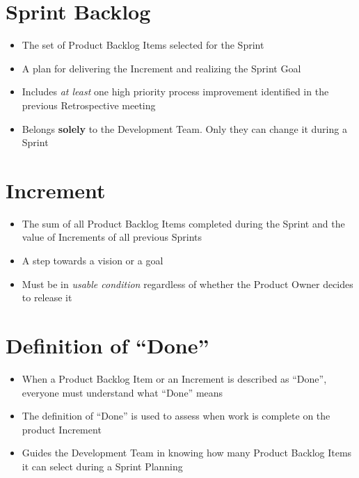 \documentclass[a4paper,11pt,twocolumn]{article}
\begin{document}
\section*{Sprint Backlog}
\begin{itemize}
	\item The set of Product Backlog Items selected for the Sprint
	\item A plan for delivering the Increment and realizing the Sprint Goal
	\item Includes \textit{at least} one high priority process improvement identified in the previous Retrospective meeting
	\item Belongs \textbf{solely} to the Development Team. Only they can change it during a Sprint
\end{itemize}

\section*{Increment}
\begin{itemize}
	\item The sum of all Product Backlog Items completed during the Sprint and the value of Increments of all previous Sprints
	\item A step towards a vision or a goal
	\item Must be in \textit{usable condition} regardless of whether the Product Owner decides to release it
\end{itemize}

\section*{Definition of ``Done''}
\begin{itemize}
	\item When a Product Backlog Item or an Increment is described as ``Done'', everyone must understand what ``Done'' means
	\item The definition of ``Done'' is used to assess when work is complete on the product Increment
    \item Guides the Development Team in knowing how many Product Backlog Items it can select during a Sprint Planning
\end{itemize}
\end{document}

